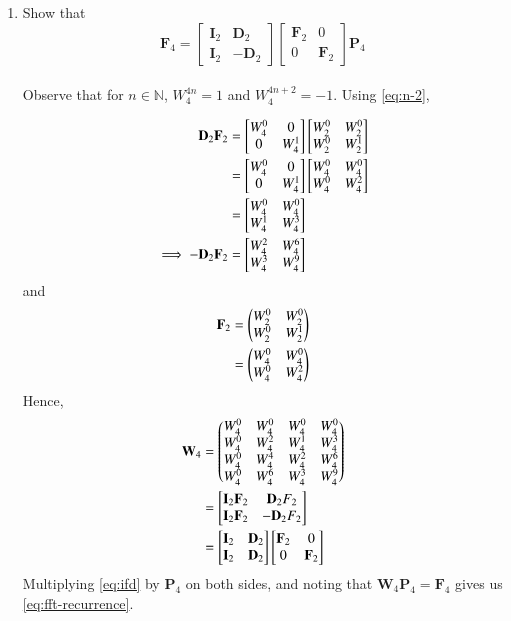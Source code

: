 \documentclass[journal,12pt,twocolumn]{IEEEtran}
\let\vec\mathbf
\renewcommand\thesection{\arabic{section}}
\begin{document}
\begin{enumerate}[label=\thesection.\arabic*]
    \item Show that 
\begin{equation}
	\vec{F}_{4}=
\begin{bmatrix}
	\vec{I}_{2} & \vec{D}_{2} \\
\vec{I}_{2} & -\vec{D}_{2}
\end{bmatrix}
\begin{bmatrix}
\vec{F}_{2} & 0 \\
0 & \vec{F}_{2}
\end{bmatrix}
\vec{P}_{4}
\label{eq:fft-recurrence}
\end{equation} \\
\solution Observe that for $n \in \mathbb{N}$, $W_4^{4n} = 1$ and $W_4^{4n + 2} = -1$. Using \eqref{eq:n-2},

\begin{align}
	\vec{D}_2\vec{F}_2 &= \mybvec{\w{4}{0} & 0 \\ 0 & \w{4}{1}}\mybvec{\w{2}{0} & \w{2}{0} \\ \w{2}{0} & \w{2}{1}} \\
					   &= \mybvec{\w{4}{0} & 0 \\ 0 & \w{4}{1}}\mybvec{\w{4}{0} & \w{4}{0} \\ \w{4}{0} & \w{4}{2}} \\
					   &= \mybvec{\w{4}{0} & \w{4}{0} \\ \w{4}{1} & \w{4}{3}} \label{eq:fft-df1} \\
	\implies -\vec{D}_2\vec{F}_2 &= \mybvec{\w{4}{2} & \w{4}{6} \\ \w{4}{3} & \w{4}{9}} \label{eq:fft-df2}
\end{align}
and
\begin{align}
	\vec{F}_2 &= \myvec{\w{2}{0} & \w{2}{0} \\ \w{2}{0} & \w{2}{1}} \\
			  &= \myvec{\w{4}{0} & \w{4}{0} \\ \w{4}{0} & \w{4}{2}}
\end{align}
Hence,
\begin{align}
	\vec{W}_4 &= \myvec{\w{4}{0} & \w{4}{0} & \w{4}{0} & \w{4}{0} \\
		\w{4}{0} & \w{4}{2} & \w{4}{1} & \w{4}{3} \\
		\w{4}{0} & \w{4}{4} & \w{4}{2} & \w{4}{6} \\
		\w{4}{0} & \w{4}{6} & \w{4}{3} & \w{4}{9} 
	} \label{eq:fft-permutation} \\
	&= \mybvec{\vec{I}_2\vec{F}_2 & \vec{D}_2{F}_2 \\ \vec{I}_2\vec{F}_2 & -\vec{D}_2{F}_2} \\
	&= \mybvec{\vec{I}_2 & \vec{D}_2 \\ \vec{I}_2 & \vec{D}_2}\mybvec{\vec{F}_2 & 0 \\ 0 & \vec{F}_2}
	\label{eq:ifd}
\end{align}
Multiplying \eqref{eq:ifd} by $\vec{P}_4$ on both sides, and noting that $\vec{W}_4\vec{P}_4 = \vec{F}_4$ gives us \eqref{eq:fft-recurrence}.
\\


\end{enumerate}
\end{document}
